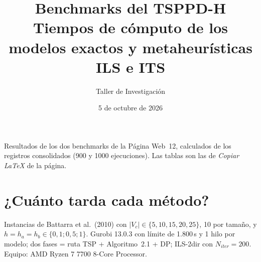 \documentclass[11pt,a4paper]{article}
\title{Benchmarks del TSPPD-H\\[4pt]\large Tiempos de cómputo de los modelos exactos y metaheurísticas ILS e ITS}
\author{Taller de Investigación}
\date{5 de octubre de 2026}
\begin{document}
\maketitle

Resultados de los dos benchmarks de la Página Web~12, calculados de los registros consolidados (900 y 1000 ejecuciones). Las tablas son las de \emph{Copiar LaTeX} de la página.

\section{¿Cuánto tarda cada método?}
\label{sec:tiempos}

Instancias de Battarra et al.~(2010) con $|V_c| \in \{5, 10, 15, 20, 25\}$, 10 por tamaño, y $h = h_a = h_b \in \{0{,}1; 0{,}5; 1\}$. Gurobi 13.0.3 con límite de 1.800\,s y 1 hilo por modelo; dos fases = ruta TSP + Algoritmo~2.1 + DP; ILS-2dir con $N_{iter} = 200$. Equipo: AMD Ryzen 7 7700 8-Core Processor.

\begin{table}[htbp]
\centering
\small
\setlength{\tabcolsep}{4pt}
\caption{Resumen por $|V_c|$ con $h = 0{,}1$. Gurobi: Ópt.\ = instancias con óptimo probado (límite 1.800\,s), Seg.\ = tiempo medio (s). Heurísticas: Desv.\ = desviación media (\%) respecto de $z^{*}_{P3}$. $^{\S}$~n.e.: Modelo General no ejecutado con $|V_c| \geq 15$.}
\label{tab:tiempos-resumen-h0-1}
\end{table}
\end{document}
